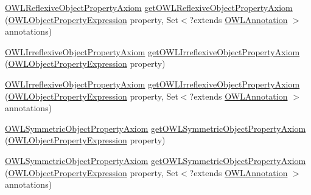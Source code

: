 \begin{DoxyCompactItemize}
\item 
\hyperlink{interfaceorg_1_1semanticweb_1_1owlapi_1_1model_1_1_o_w_l_reflexive_object_property_axiom}{O\-W\-L\-Reflexive\-Object\-Property\-Axiom} \hyperlink{interfaceorg_1_1semanticweb_1_1owlapi_1_1model_1_1_o_w_l_data_factory_a265bc6272ef4f80641a9d3213816d79a}{get\-O\-W\-L\-Reflexive\-Object\-Property\-Axiom} (\hyperlink{interfaceorg_1_1semanticweb_1_1owlapi_1_1model_1_1_o_w_l_object_property_expression}{O\-W\-L\-Object\-Property\-Expression} property, Set$<$?extends \hyperlink{interfaceorg_1_1semanticweb_1_1owlapi_1_1model_1_1_o_w_l_annotation}{O\-W\-L\-Annotation} $>$ annotations)
\item 
\hyperlink{interfaceorg_1_1semanticweb_1_1owlapi_1_1model_1_1_o_w_l_irreflexive_object_property_axiom}{O\-W\-L\-Irreflexive\-Object\-Property\-Axiom} \hyperlink{interfaceorg_1_1semanticweb_1_1owlapi_1_1model_1_1_o_w_l_data_factory_af165b242d376d02dc957bb608df734cc}{get\-O\-W\-L\-Irreflexive\-Object\-Property\-Axiom} (\hyperlink{interfaceorg_1_1semanticweb_1_1owlapi_1_1model_1_1_o_w_l_object_property_expression}{O\-W\-L\-Object\-Property\-Expression} property)
\item 
\hyperlink{interfaceorg_1_1semanticweb_1_1owlapi_1_1model_1_1_o_w_l_irreflexive_object_property_axiom}{O\-W\-L\-Irreflexive\-Object\-Property\-Axiom} \hyperlink{interfaceorg_1_1semanticweb_1_1owlapi_1_1model_1_1_o_w_l_data_factory_abcc6f77b8ef72cf20ee2ec2e3e81cb18}{get\-O\-W\-L\-Irreflexive\-Object\-Property\-Axiom} (\hyperlink{interfaceorg_1_1semanticweb_1_1owlapi_1_1model_1_1_o_w_l_object_property_expression}{O\-W\-L\-Object\-Property\-Expression} property, Set$<$?extends \hyperlink{interfaceorg_1_1semanticweb_1_1owlapi_1_1model_1_1_o_w_l_annotation}{O\-W\-L\-Annotation} $>$ annotations)
\item 
\hyperlink{interfaceorg_1_1semanticweb_1_1owlapi_1_1model_1_1_o_w_l_symmetric_object_property_axiom}{O\-W\-L\-Symmetric\-Object\-Property\-Axiom} \hyperlink{interfaceorg_1_1semanticweb_1_1owlapi_1_1model_1_1_o_w_l_data_factory_aba9b31992ec5d20e7de1df69c6d3dff9}{get\-O\-W\-L\-Symmetric\-Object\-Property\-Axiom} (\hyperlink{interfaceorg_1_1semanticweb_1_1owlapi_1_1model_1_1_o_w_l_object_property_expression}{O\-W\-L\-Object\-Property\-Expression} property)
\item 
\hyperlink{interfaceorg_1_1semanticweb_1_1owlapi_1_1model_1_1_o_w_l_symmetric_object_property_axiom}{O\-W\-L\-Symmetric\-Object\-Property\-Axiom} \hyperlink{interfaceorg_1_1semanticweb_1_1owlapi_1_1model_1_1_o_w_l_data_factory_ae49d3f5b06ed3c9ceab7805856161771}{get\-O\-W\-L\-Symmetric\-Object\-Property\-Axiom} (\hyperlink{interfaceorg_1_1semanticweb_1_1owlapi_1_1model_1_1_o_w_l_object_property_expression}{O\-W\-L\-Object\-Property\-Expression} property, Set$<$?extends \hyperlink{interfaceorg_1_1semanticweb_1_1owlapi_1_1model_1_1_o_w_l_annotation}{O\-W\-L\-Annotation} $>$ annotations)

\end{DoxyCompactItemize}
